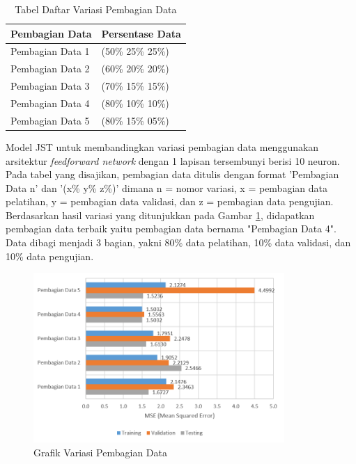 \begin{table}[!h]
	\caption{Tabel Daftar Variasi Pembagian Data}
	\label{tbl:5:NeuronVariation}
	\centering
	\begin{tabular}{|p{3.2cm}|p{3cm}|}
		\hline
		\textbf{Pembagian Data} & \textbf{Persentase Data} \\ \hline
		Pembagian Data 1 & (50\% 25\% 25\%) \\ \hline
		Pembagian Data 2 & (60\% 20\% 20\%) \\ \hline
		Pembagian Data 3 & (70\% 15\% 15\%) \\ \hline
		Pembagian Data 4 & (80\% 10\% 10\%) \\ \hline
		Pembagian Data 5 & (80\% 15\% 05\%) \\ \hline
	\end{tabular}
\end{table}
\vspace{2em}

Model JST untuk membandingkan variasi pembagian data menggunakan arsitektur \textit{feedforward network} dengan 1 lapisan tersembunyi berisi 10 neuron. Pada tabel yang disajikan, pembagian data ditulis dengan format ’Pembagian Data n’ dan ’(x\% y\% z\%)’ dimana n = nomor variasi, x = pembagian data pelatihan, y = pembagian data validasi, dan z = pembagian data pengujian. Berdasarkan hasil variasi yang ditunjukkan pada Gambar \ref{fig:5:DataSplittingVariation}, didapatkan pembagian data terbaik yaitu pembagian data bernama "Pembagian Data 4". Data dibagi menjadi 3 bagian, yakni 80\% data pelatihan, 10\% data validasi, dan 10\% data pengujian.

\begin{figure}[!h]
	\centering
	\includegraphics[width=0.85\textwidth]{figures/VariasiPembagianDataJSTKontroler}
	\caption{Grafik Variasi Pembagian Data}
	\label{fig:5:DataSplittingVariation}
\end{figure}

